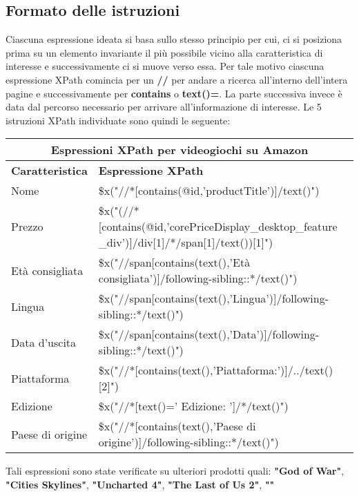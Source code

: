 \documentclass[12pt, letterpaper]{article}
\begin{document}
\subsection{Formato delle istruzioni}
Ciascuna espressione ideata si basa sullo stesso principio per cui, ci si posiziona prima su un elemento invariante il più possibile vicino alla caratteristica di interesse e successivamente ci si muove verso essa. Per tale motivo ciascuna espressione XPath comincia per un \textbf{//} per andare a ricerca all'interno dell'intera pagine e successivamente per \textbf{contains} o \textbf{text()=}. La parte successiva invece è data dal percorso necessario per arrivare all'informazione di interesse. Le 5 istruzioni XPath individuate sono quindi le seguente:
\begin{center}
\begin{table}[!h]
\begin{tabular}{ |p{3cm}|p{10cm}| }
\hline
\multicolumn{2}{|c|}{\textbf{Espressioni XPath per videogiochi su Amazon}} \\
\hline
 \hline
\textbf{Caratteristica} & \textbf{Espressione XPath} \\[1ex]
 \hline\hline
Nome & \$x("//*[contains(@id,'productTitle')]/text()") \\
Prezzo & \$x("(//*[contains(@id,'corePriceDisplay\_desktop\_feature
\_div')]/div[1]/*/span[1]/text())[1]")  \\
Età consigliata & \$x("//span[contains(text(),'Età consigliata')]/following-sibling::*/text()") \\
Lingua & \$x("//span[contains(text(),'Lingua')]/following-sibling::*/text()") \\
Data d'uscita & \$x("//span[contains(text(),'Data')]/following-sibling::*/text()") \\
Piattaforma & \$x("//*[contains(text(),'Piattaforma:')]/../text()[2]") \\
Edizione & \$x("//*[text()=' Edizione: ']/*/text()") \\
Paese di origine & \$x("//*[contains(text(),'Paese di origine')]/following-sibling::*/text()") \\
 \hline
\end{tabular}
\end{table}
\end{center}

Tali espressioni sono state verificate su ulteriori prodotti quali: \textbf{"God of War"}, \textbf{"Cities Skylines"}, \textbf{"Uncharted 4"}, \textbf{"The Last of Us 2"}, \textbf{""}
\end{document}
